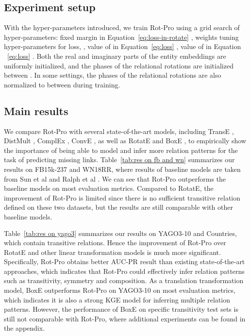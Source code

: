 \documentclass{article}
\begin{document}
\subsection{Experiment setup}
With the hyper-parameters introduced, we train Rot-Pro using a grid search of hyper-parameters: fixed margin  in Equation~\ref{eq:loss-in-rotate} , weights tuning hyper-parameters for loss, , value of  in Equation~\ref{eq:loss} , value of  in Equation ~\ref{eq:loss} .
Both the real and imaginary parts of the entity embeddings are uniformly initialized, and the phases of the relational rotations are initialized between . In some settings, the phases of the relational rotations are also normalized to between  during training.

\subsection{Main results}
\label{results}
We compare Rot-Pro with several state-of-the-art models, including TransE \citep{transe}, DistMult \citep{distmult}, ComplEx \citep{CompLex}, ConvE \citep{conve}, as well as RotatE \citep{rotate} and BoxE \citep{abboud2020boxe}, to empirically show the importance
of being able to model and infer more relation patterns for the task of predicting missing links.
Table~\ref{tab:res on  fb and wn} summarizes our results on FB15k-237 and WN18RR, where results of baseline models are taken from Sun et al \citep{rotate} and Ralph et al \citep{abboud2020boxe}. We can see that Rot-Pro outperforms the baseline models on most evaluation metrics.
Compared to RotatE, the improvement of Rot-Pro is limited  since there is no sufficient  transitive relation defined on these two datasets, but the results are still comparable with other baseline models.

Table~\ref{tab:res on yago3} summarizes our results on YAGO3-10 and Countries, which contain transitive relations. Hence the improvement of Rot-Pro over RotatE and other linear transformation models is much more significant. Specifically, Rot-Pro obtains better AUC-PR result than existing state-of-the-art approaches, which indicates that Rot-Pro could effectively infer relation patterns such as transitivity, symmetry and composition.
As a translation transformation model, BoxE outperforms Rot-Pro on YAGO3-10 on most evaluation metrics, which indicates it is also a strong KGE model for inferring  multiple relation patterns. However, the performance of BoxE on specific transitivity test sets is still not comparable with Rot-Pro, where additional experiments can be found in the appendix.
\end{document}
